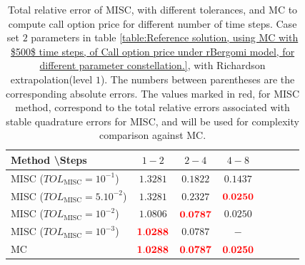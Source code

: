 \begin{table}[h!]
	\centering
	\begin{tabular}{l*{6}{c}r}
		Method \textbackslash  Steps            & $1-2$ & $2-4$ & $4-8$  \\
		\hline
		MISC ($TOL_{\text{MISC}}=10^{-1}$)  & $\mathbf{  1.3281}$ & $\mathbf{0.1822}$ & $\mathbf{0.1437}$   \\
		MISC ($TOL_{\text{MISC}}=5.10^{-2}$)  & $\mathbf{  1.3281}$ & $\mathbf{ 0.2327}$ & $\mathbf{  {\color{red}0.0250}}$   \\
		MISC ($TOL_{\text{MISC}}=10^{-2}$)  & $\mathbf{   1.0806
		}$ & $\mathbf{    {\color{red}0.0787}}$ & $\mathbf{ 0.0250}$  \\
		MISC ($TOL_{\text{MISC}}=10^{-3}$)  & $\mathbf{ {\color{red}  1.0288}}$ & $\mathbf{    0.0787}$ & $\mathbf{-}$  \\
		

		\hline
		
		MC &$\mathbf{ {\color{red}  1.0288}}$  & $\mathbf{{\color{red}0.0787}}$ & $\mathbf{{\color{red}0.0250}}$  \\
		
		\hline
	\end{tabular}
	\caption{Total relative error of MISC, with different tolerances,  and MC to compute call option price  for different number of time steps. Case set $2$ parameters in table \ref{table:Reference solution, using MC with $500$ time steps, of Call option price under rBergomi model, for different parameter constellation.}, with Richardson extrapolation(level $1$). The numbers between parentheses are the corresponding absolute errors. The values marked in red, for MISC method, correspond to the total relative errors associated with  stable quadrature errors for MISC, and will be used for complexity comparison against MC.}
	\label{Total  error of MISC and MC to compute Call option price of the different tolerances for different number of time steps. Case set $2$ parameters, with Richardson extrapolation(level $1$). The numbers between parentheses are the corresponding absolute errors,relative}
\end{table}



